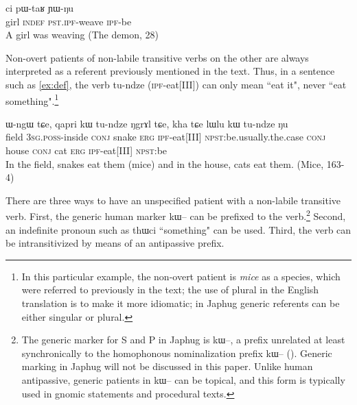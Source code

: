 \documentclass[oldfontcommands,oneside,a4paper,11pt]{article}
\newcommand{\ipa}[1]{{\phon \mbox{#1}}} %
\begin{document}
 \begin{exe}
\ex \label{ex:pWtaR}
\gll  \ipa{tɕheme} 	\ipa{ci} 	\ipa{pɯ-taʁ} 	\ipa{ɲɯ-ŋu}  \\
girl \textsc{indef} \textsc{pst.ipf}-weave \textsc{ipf}-be \\
\glt A girl was weaving (The demon, 28)
 \end{exe}
 
Non-overt patients of non-labile transitive verbs on the other are always interpreted  as a referent previously mentioned in the text. Thus,  in a sentence such as \ref{ex:def}, the verb \ipa{tu-ndze} (\textsc{ipf}-eat[III]) can only mean ``eat it", never ``eat something".\footnote{In this particular example, the non-overt patient is \textit{mice} as a species, which were referred to previously in the text; the use of plural in the English translation is to make it more idiomatic; in Japhug generic referents can be either singular or plural.}

\begin{exe}
\ex \label{ex:def}
\gll  \ipa{tɯji} 	\ipa{ɯ-ngɯ} 	\ipa{tɕe,} 	\ipa{qapri} 	\ipa{kɯ} 	\ipa{tu-ndze} 	\ipa{ŋgrɤl} 	\ipa{tɕe,} 						
\ipa{kha} 	\ipa{tɕe} 	\ipa{lɯlu} 	\ipa{kɯ} 	\ipa{tu-ndze} 	\ipa{ŋu} 	    \\
field \textsc{3sg.poss}-inside \textsc{conj} snake \textsc{erg} \textsc{ipf}-eat[III] \textsc{npst}:be.usually.the.case \textsc{conj} house  \textsc{conj}  cat \textsc{erg} \textsc{ipf}-eat[III] \textsc{npst}:be \\
\glt In the field,   snakes  eat  them (mice) and in the house,    cats eat  them.  (Mice, 163-4) 
\end{exe}

 
There are three ways to have an unspecified patient with a non-labile transitive verb.  First,  the generic human marker \ipa{kɯ}-- can be prefixed to the verb.\footnote{The generic marker for S and P in Japhug is \ipa{kɯ}--, a prefix unrelated at least synchronically to the homophonous nominalization prefix \ipa{kɯ}--  (\citealt[204-89]{jacques12demotion}). Generic marking in Japhug will not be discussed in this paper. Unlike human antipassive, generic patients in \ipa{kɯ}-- can be topical, and this form is typically used in gnomic statements and procedural texts.} Second,  an indefinite pronoun such as \ipa{thɯci} ``something" can be used. Third, the verb can be intransitivized by means of an antipassive prefix.
\end{document}
